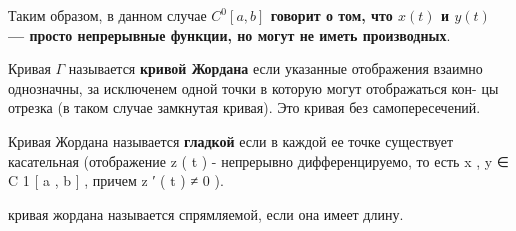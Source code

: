 \documentclass{article}
\begin{document}
Таким образом, в данном случае \textbf{\( C^0[a, b] \) говорит о том, что \( x(t) \) и \( y(t) \) — просто непрерывные функции, но могут не иметь производных}.


Кривая $\Gamma $ называется \textbf{кривой Жордана} если указанные отображения 
взаимно однозначны, за исключенем одной точки в которую могут отображаться кон-
цы отрезка (в таком случае замкнутая кривая). Это кривая без самопересечений.

Кривая Жордана называется \textbf{гладкой} если в каждой ее точке существует касательная
(отображение 
z
(
t
)
 - непрерывно дифференцируемо, то есть 
x
,
y
∈
C
1
[
a
,
b
]
, причем 
z
′
(
t
)
≠
0
).

кривая жордана называется спрямляемой, если она имеет длину. 
\end{document}
